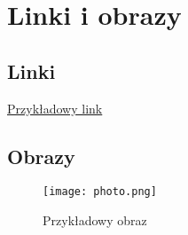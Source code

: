 \documentclass{article}
\begin{document}
\section{Linki i obrazy}



\subsection{Linki}



\href{https://example.com}{Przykładowy link}




\subsection{Obrazy}



\begin{figure}[h]
  \centering
  \texttt{[image: photo.png]}
  \caption{Przykładowy obraz}
\end{figure}
\end{document}
